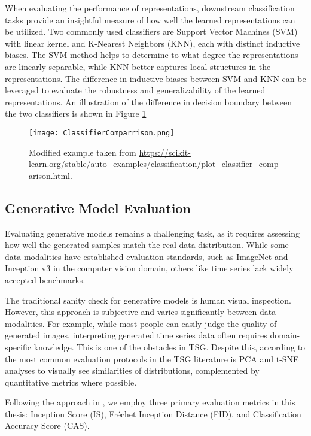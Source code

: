 \documentclass[../../thesis.tex]{subfiles}
\begin{document}
When evaluating the performance of representations, downstream classification tasks provide an insightful measure of how well the learned representations can be utilized. Two commonly used classifiers are Support Vector Machines (SVM) with linear kernel and K-Nearest Neighbors (KNN), each with distinct inductive biases. The SVM method helps to determine to what degree the representations are linearly separable, while KNN better captures local structures in the representations. The difference in inductive biases between SVM and KNN can be leveraged to evaluate the robustness and generalizability of the learned representations. An illustration of the difference in decision boundary between the two classifiers is shown in Figure \ref{fig:ClassifierComparrison}

\begin{figure}[h]
    \texttt{[image: ClassifierComparrison.png]}
    \centering
    \caption{Modified example taken from \url{https://scikit-learn.org/stable/auto_examples/classification/plot_classifier_comparison.html}.}
    \label{fig:ClassifierComparrison}
\end{figure}

\subsection{Generative Model Evaluation}

Evaluating generative models remains a challenging task, as it requires assessing how well the generated samples match the real data distribution. While some data modalities have established evaluation standards, such as ImageNet and Inception v3 in the computer vision domain, others like time series lack widely accepted benchmarks.\newline

The traditional sanity check for generative models is human visual inspection. However, this approach is subjective and varies significantly between data modalities. For example, while most people can easily judge the quality of generated images, interpreting generated time series data often requires domain-specific knowledge. This is one of the obstacles in TSG. Despite this, according to \cite{TimeVQVAE} the most common evaluation protocols in the TSG literature is PCA and t-SNE analyses to visually see similarities of distributions, complemented by quantitative metrics where possible.\newline

Following the approach in \cite{TimeVQVAE}, we employ three primary evaluation metrics in this thesis: Inception Score (IS), Fréchet Inception Distance (FID), and Classification Accuracy Score (CAS).\newline
\end{document}
